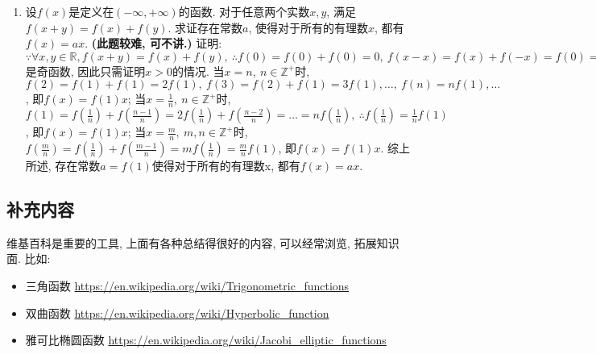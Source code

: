 \documentclass[12pt,UTF8]{ctexart}
\begin{document}
\begin{enumerate}
\newline
由$y=\ln(\sqrt{x^2+1}+x)$得$e^y=\sqrt{x^2+1}+x$(*), 由$y(x)=-y(-x)=-\ln(\sqrt{x^2+1}-x)$得$e^{-y}=\sqrt{x^2+1}-x$(**). (*)式和(**)相减可得$x=\frac{e^y-e^{-y}}2$. 反函数为$y=\frac{e^x-e^{-x}}2$.
\item[\bf4.]设$f(x)$是定义在$(-\infty,+\infty)$的函数. 对于任意两个实数$x,y$, 满足$f(x+y)=f(x)+f(y)$. 求证存在常数$a$, 使得对于所有的有理数$x$, 都有$f(x)=ax$.
\newline
{\bf(此题较难, 可不讲.)}
\newline
证明: $\because\forall x,y\in\mathbb R,f(x+y)=f(x)+f(y),\ \therefore f(0)=f(0)+f(0)=0,\ f(x-x)=f(x)+f(-x)=f(0)=0,\ \therefore f(x)=-f(-x),\ \therefore f(x)$是奇函数, 因此只需证明$x>0$的情况. 
\newline
当$x=n,\ n\in\mathbb Z^+$时, $f(2)=f(1)+f(1)=2f(1),\ f(3)=f(2)+f(1)=3f(1),\dots,\ f(n)=nf(1),\dots$, 即$f(x)=f(1)x$;
\newline
当$x=\frac1n,\ n\in\mathbb Z^+$时, $f(1)=f(\frac1n)+f(\frac{n-1}n)=2f(\frac1n)+f(\frac{n-2}n)=\dots=nf(\frac1n),\ \therefore f(\frac1n)=\frac1nf(1)$, 即$f(x)=f(1)x$;
\newline
当$x=\frac mn,\ m,n\in\mathbb Z^+$时, $f(\frac mn)=f(\frac1n)+f(\frac{m-1}n)=mf(\frac1n)=\frac mnf(1)$, 即$f(x)=f(1)x$.
\newline
综上所述, 存在常数$a=f(1)$使得对于所有的有理数x, 都有$f(x)=ax$.
\end{enumerate}
\subsection{补充内容}
维基百科是重要的工具, 上面有各种总结得很好的内容, 可以经常浏览, 拓展知识面. 比如:
\begin{itemize}
	\item 三角函数 \url{https://en.wikipedia.org/wiki/Trigonometric_functions}
	\item 双曲函数 \url{https://en.wikipedia.org/wiki/Hyperbolic_function}
	\item 雅可比椭圆函数 \url{https://en.wikipedia.org/wiki/Jacobi_elliptic_functions}
\end{itemize}
\end{document}
